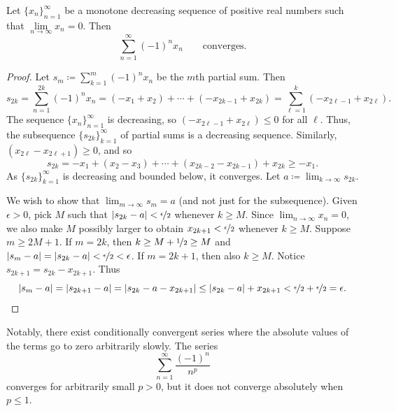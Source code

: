 \begin{prop}
Let $\{ x_n \}_{n=1}^\infty$ be a monotone decreasing sequence of positive real numbers such
that $\lim\limits_{n\to\infty} x_n = 0$.  Then
\begin{equation*}
\sum_{n=1}^\infty {(-1)}^n x_n \qquad \text{converges.}
\end{equation*}
\end{prop}

\begin{proof}
Let $s_m \coloneqq \sum_{k=1}^m {(-1)}^n x_n$ be the $m$th partial sum.  Then
\begin{equation*}
s_{2k} =
\sum_{n=1}^{2k} {(-1)}^n x_n
=
(-x_1 + x_2) + \cdots + (-x_{2k-1} + x_{2k})
=
\sum_{\ell=1}^{k} (-x_{2\ell-1} + x_{2\ell}) .
\end{equation*}
The sequence $\{ x_n \}_{n=1}^\infty$ is decreasing, so $(-x_{2\ell-1}+x_{2\ell}) \leq 0$
for all $\ell$.
Thus, the subsequence $\{ s_{2k} \}_{k=1}^\infty$ of partial sums
is a decreasing sequence.  Similarly, $(x_{2\ell}-x_{2\ell+1}) \geq 0$, and so
\begin{equation*}
s_{2k} = - x_1 + ( x_2 - x_3 ) + \cdots + ( x_{2k-2} - x_{2k-1} ) + x_{2k}
\geq -x_1 .
\end{equation*}
As $\{ s_{2k} \}_{k=1}^\infty$ is decreasing and bounded below, it converges.
Let $a \coloneqq \lim_{k\to\infty} s_{2k}$.

We wish to show that $\lim_{m\to\infty} s_m = a$ (and not just for the subsequence).
Given $\epsilon > 0$, pick $M$ such that $\left\lvert {s_{2k}-a} \right\rvert <
\nicefrac{\epsilon}{2}$ whenever $k \geq M$.
Since $\lim_{n\to\infty} x_n = 0$, we also
make $M$ possibly larger
to obtain
$x_{2k+1} < \nicefrac{\epsilon}{2}$ whenever $k \geq M$.  
Suppose $m \geq 2M+1$.  If $m=2k$, then $k \geq M+\nicefrac{1}{2} \geq M$ and
$\left\lvert {s_{m}-a} \right\rvert=\left\lvert {s_{2k}-a} \right\rvert < \nicefrac{\epsilon}{2} < \epsilon$.
If $m=2k+1$, then also $k \geq M$.  Notice
$s_{2k+1} = s_{2k} - x_{2k+1}$.
Thus
\begin{equation*}
\left\lvert {s_{m}-a} \right\rvert = 
\left\lvert {s_{2k+1}-a} \right\rvert = 
\left\lvert {s_{2k}-a - x_{2k+1}} \right\rvert \leq
\left\lvert {s_{2k}-a} \right\rvert + x_{2k+1} < 
\nicefrac{\epsilon}{2}+ \nicefrac{\epsilon}{2} = \epsilon .  \qedhere
\end{equation*}
\end{proof}

Notably, there exist conditionally convergent series
where the absolute values of the terms go to zero arbitrarily slowly.
The series
\begin{equation*}
\sum_{n=1}^\infty \frac{{(-1)}^n}{n^p}
\end{equation*}
converges for arbitrarily small $p > 0$, but it does not converge
absolutely when $p \leq 1$.

